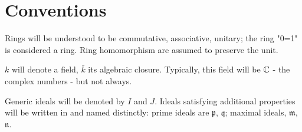 \section{Conventions}


Rings will be understood to be commutative, associative, unitary; the ring "0=1" is considered a ring. Ring homomorphism are assumed to preserve the unit.

$k$ will denote a field, $\bar k$ its algebraic closure. Typically, this field will be $\mathbb C$ - the complex numbers - but not always.

Generic ideals will be denoted by $I$ and $J$. Ideals satisfying additional properties will be written in  and named distinctly: prime ideals are $\mathfrak p$, $\mathfrak q$; maximal ideals, $\mathfrak m$, $\mathfrak n$.


